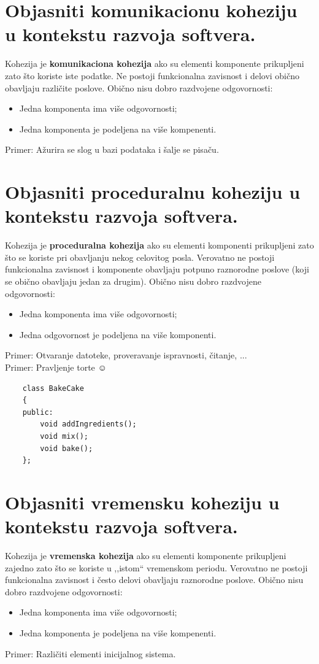 \documentclass[a4paper]{article}
\begin{document}
\section{Objasniti komunikacionu koheziju u kontekstu razvoja softvera.}
  Kohezija je \textbf{komunikaciona kohezija} ako su elementi komponente prikupljeni 
  zato što koriste iste podatke. Ne postoji funkcionalna zavisnost i delovi obično obavljaju
  različite poslove. Obično nisu dobro razdvojene odgovornosti: 
  \begin{itemize}
    \item Jedna komponenta ima više odgovornosti;
    \item Jedna komponenta je podeljena na više kompenenti.
  \end{itemize}
  Primer: Ažurira se slog u bazi podataka i šalje se pisaču.

\section{Objasniti proceduralnu koheziju u kontekstu razvoja softvera.}
  Kohezija je \textbf{proceduralna kohezija} ako su elementi komponenti prikupljeni zato što
  se koriste pri obavljanju nekog celovitog posla. Verovatno ne postoji funkcionalna
  zavisnost i komponente obavljaju potpuno raznorodne poslove (koji se obično obavljaju
  jedan za drugim). Obično nisu dobro razdvojene odgovornosti:
  \begin{itemize}
    \item Jedna komponenta ima više odgovornosti;
    \item Jedna odgovornost je podeljena na više komponenti.
  \end{itemize}
  Primer: Otvaranje datoteke, proveravanje ispravnosti, čitanje, ...\\
  Primer: Pravljenje torte $\smiley{}$

  \begin{lstlisting}
    class BakeCake
    {
    public:
        void addIngredients();
        void mix();
        void bake();
    };\end{lstlisting}

\section{Objasniti vremensku koheziju u kontekstu razvoja softvera.}
  Kohezija je \textbf{vremenska kohezija} ako su elementi komponente prikupljeni zajedno 
  zato što se koriste u ,,istom`` vremenskom periodu. Verovatno ne postoji funkcionalna zavisnost i
  često delovi obavljaju raznorodne poslove. Obično nisu dobro razdvojene odgovornosti: 
  \begin{itemize}
    \item Jedna komponenta ima više odgovornosti;
    \item Jedna komponenta je podeljena na više kompenenti.
  \end{itemize}
  Primer: Različiti elementi inicijalnog sistema. 
\end{document}
